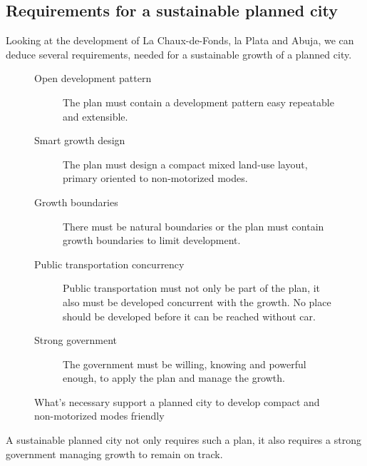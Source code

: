 \documentclass{article}
\begin{document}
\begin{multicols}{2}
		\subsection{Requirements for a sustainable planned city}
		
		Looking at the development of La Chaux-de-Fonds, la Plata and Abuja, we can deduce several requirements, needed for a sustainable growth of a planned city.
		
			\begin{figure}[H]
				\begin{description}
					\item [Open development pattern] The plan must contain a development pattern easy repeatable and extensible.
					\item [Smart growth design] The plan must design a compact mixed land-use layout, primary oriented to non-motorized modes.
					\item [Growth boundaries] There must be natural boundaries or the plan must contain growth boundaries to limit development.
					\item [Public transportation concurrency] Public transportation must not only be part of the plan, it also must be developed concurrent with the growth. No place should be developed before it can be reached without car.
					\item [Strong government] The government must be willing, knowing and powerful enough, to apply the plan and manage the growth.
				\end{description}
				\caption{What's necessary support a planned city to develop compact and non-motorized modes friendly}
				\label{fig:list:la-chaux-de-fonds-development-reasons}
			\end{figure}
			
			A sustainable planned city not only requires such a plan, it also requires a strong government managing growth to remain on track.
			
			
	\end{multicols}
	
	

	
	
	\clearpage
	\begin{appendix}
		
		
	
		\listoffigures
	
		\listoftables
	\end{appendix}
\end{document}
